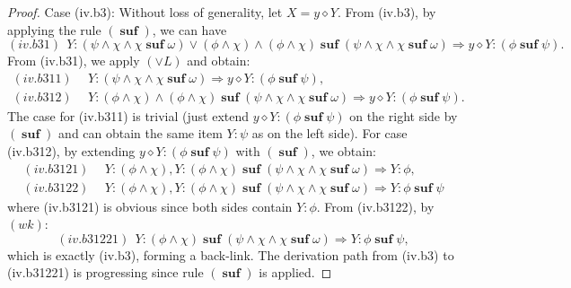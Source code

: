 \documentclass[manuscript,screen]{acmart}
\newcommand{\cat}[0]{\diamond}
\DeclareMathOperator{\osuf}{\mathbf{suf}}
\begin{document}
\begin{proof}
\ifx
Case (iv.b3): Without loss of generality, let $X = y\cat Y$.
From (iv.b3), by applying the rule $(\osuf)$, we can have
$$
(iv.b31)\ \  Y : (\psi\wedge \chi\wedge \chi\osuf\omega) \vee (\phi\wedge\chi)\wedge (\phi\wedge\chi)\osuf (\psi\wedge \chi\wedge \chi\osuf\omega)\Rightarrow y\cat Y : (\phi\osuf \psi). 
$$
From (iv.b31), we apply $(\vee L)$ and obtain:
$$
\begin{aligned}
(iv.b311)\ \ & Y : (\psi\wedge \chi\wedge \chi\osuf\omega) \Rightarrow y\cat Y : (\phi\osuf \psi), \\
(iv.b312)\ \ & Y : (\phi\wedge\chi)\wedge (\phi\wedge\chi)\osuf (\psi\wedge \chi\wedge \chi\osuf\omega) \Rightarrow y\cat Y : (\phi\osuf \psi). 
\end{aligned}
$$
The case for (iv.b311) is trivial (just extend $y\cat Y : (\phi\osuf \psi)$ on the right side by $(\osuf)$ and can obtain the same item $Y : \psi$ as on the left side).
For case (iv.b312), by extending $y\cat Y : (\phi\osuf\psi)$ with $(\osuf)$, we obtain:
$$
\begin{aligned}
(iv.b3121)\ \ & Y : (\phi\wedge\chi), Y : (\phi\wedge\chi)\osuf (\psi\wedge \chi\wedge \chi\osuf\omega) \Rightarrow Y : \phi,\\
(iv.b3122)\ \ & Y : (\phi\wedge\chi), Y : (\phi\wedge\chi)\osuf (\psi\wedge \chi\wedge \chi\osuf\omega) \Rightarrow Y : \phi\osuf \psi
\end{aligned}
$$
where (iv.b3121) is obvious since both sides contain $Y:\phi$.
From (iv.b3122), by $(wk)$:
$$
(iv.b31221)\ \ Y : (\phi\wedge\chi)\osuf (\psi\wedge \chi\wedge \chi\osuf\omega) \Rightarrow Y : \phi\osuf \psi, 
$$
which is exactly (iv.b3), forming a back-link.
The derivation path from (iv.b3) to (iv.b31221) is progressing since rule $(\osuf)$ is applied.
\fi


\end{proof}
\end{document}
